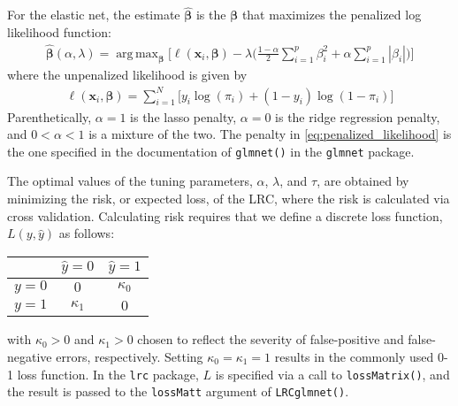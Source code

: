 \documentclass{article}
\DeclareMathOperator*{\argmax}{arg\,max}
\begin{document}
For the elastic net, the estimate $\hat{\boldsymbol{\beta}}$ is the $\boldsymbol{\beta}$
that maximizes the penalized log likelihood function:
\begin{align}
\label{eq:penalized_likelihood}
\hat{\boldsymbol{\beta}}(\alpha,\lambda) = \argmax_{\boldsymbol{\beta}} \Biggl[ \ell(\mathbf{x}_i,\boldsymbol{\beta}) - \lambda 
\biggl( \frac{1-\alpha}{2} \sum_{i=1}^p \beta_i^2 + \alpha \sum_{i=1}^p |\beta_i| \biggr) \Biggr]
\end{align}
\noindent where the unpenalized likelihood is given by
\begin{align}
\ell(\mathbf{x}_i,\boldsymbol{\beta}) = \sum_{i=1}^N \bigl[ y_i \log(\pi_i) + (1 - y_i)\log(1-\pi_i) \bigr]
\end{align}
\noindent Parenthetically, $\alpha = 1$ is the lasso penalty, $\alpha = 0$ is the ridge regression penalty,
and $0 < \alpha < 1$ is a mixture of the two. The penalty in \eqref{eq:penalized_likelihood} is the one
specified in the documentation of {\tt glmnet()} in the {\tt glmnet} package.

The optimal values of the tuning parameters, $\alpha$, $\lambda$, and $\tau$, are obtained by minimizing 
the risk, or expected loss, of 
the LRC, where the risk is calculated via cross validation.  Calculating risk requires that we define a discrete 
loss function, $L(y,\hat{y})$ as follows:
\begin{table}[H]
\begin{center}
\begin{tabular}{c|cc}
& $\hat{y} = 0$ & $\hat{y} = 1$ \\
\hline
$y = 0$ & $0$ & $\kappa_0$ \\
$y = 1$ & $\kappa_1$ & $0$ \\
\end{tabular}
\end{center}
\end{table}
\noindent with $\kappa_0 > 0$ and $\kappa_1 > 0$ chosen to reflect the severity of false-positive and 
false-negative errors, respectively.  Setting $\kappa_0 = \kappa_1 = 1$ results in the commonly used 0-1 loss
function.  In the {\tt lrc} package, $L$ is specified via a call to {\tt lossMatrix()}, and the result is passed to
the {\tt lossMatt} argument of {\tt LRCglmnet()}.
\end{document}
